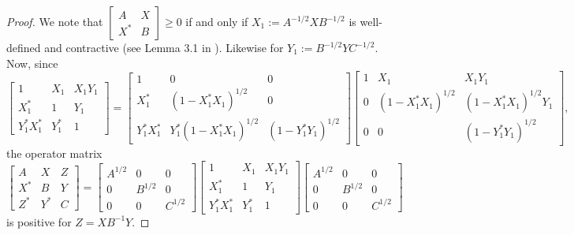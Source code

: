 \documentclass[12pt]{amsart}
\theoremstyle{definition}
\begin{document}
\begin{proof}
We note that $\left[\begin{smallmatrix} A & X \\ X^* & B\end{smallmatrix}\right]\geq0$
if and only if $X_1:=A^{-1/2}XB^{-1/2}$ is well-defined and contractive
(see Lemma 3.1 in \cite{paulsen}).
Likewise for $Y_1:=B^{-1/2}YC^{-1/2}$.
Now, since
\[
\left[\begin{smallmatrix}
1 & X_1 & X_1Y_1\\ X_1^* & 1 & Y_1\\ Y_1^*X_1^* & Y_1^* & 1
\end{smallmatrix}\right] = \left[\begin{smallmatrix}
1 & 0 & 0\\ X_1^* & (1-X_1^*X_1)^{1/2} & 0\\ Y_1^*X_1^* & Y_1^*(1-X_1^*X_1)^{1/2} & (1-Y_1^*Y_1)^{1/2}
\end{smallmatrix}\right] \left[\begin{smallmatrix}
1 & X_1 & X_1Y_1\\ 0 & (1-X_1^*X_1)^{1/2} & (1-X_1^*X_1)^{1/2}Y_1\\ 0 & 0 & (1-Y_1^*Y_1)^{1/2}
\end{smallmatrix}\right],
\]
the operator matrix
\[
\left[\begin{smallmatrix}
A & X & Z \\ X^* & B & Y\\ Z^* & Y^* & C
\end{smallmatrix}\right] = \left[\begin{smallmatrix}
A^{1/2} & 0 & 0\\ 0 & B^{1/2} & 0\\ 0 & 0 & C^{1/2}
\end{smallmatrix}\right] \left[\begin{smallmatrix}
1 & X_1 & X_1Y_1\\ X_1^* & 1 & Y_1\\ Y_1^*X_1^* & Y_1^* & 1
\end{smallmatrix}\right] \left[\begin{smallmatrix}
A^{1/2} & 0 & 0\\ 0 & B^{1/2} & 0\\ 0 & 0 & C^{1/2}
\end{smallmatrix}\right]
\]
is positive for $Z=XB^{-1}Y$.
\end{proof}
\end{document}

